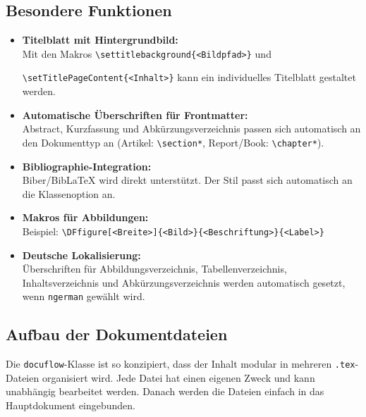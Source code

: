 \subsection{Besondere Funktionen}

\begin{itemize}
    \item \textbf{Titelblatt mit Hintergrundbild:}\\
    Mit den Makros \verb|\settitlebackground{<Bildpfad>}| und 
    
    \verb|\setTitlePageContent{<Inhalt>}| kann ein individuelles Titelblatt gestaltet werden.

    \item \textbf{Automatische Überschriften für Frontmatter:}\\
    Abstract, Kurzfassung und Abkürzungsverzeichnis passen sich automatisch an den Dokumenttyp an (Artikel: \verb|\section*|, Report/Book: \verb|\chapter*|).

    \item \textbf{Bibliographie-Integration:}\\
    Biber/BibLaTeX wird direkt unterstützt. Der Stil passt sich automatisch an die Klassenoption an.

    \item \textbf{Makros für Abbildungen:}\\
    Beispiel: \verb|\DFfigure[<Breite>]{<Bild>}{<Beschriftung>}{<Label>}|
    
    \item \textbf{Deutsche Lokalisierung:}\\
    Überschriften für Abbildungsverzeichnis, Tabellenverzeichnis, Inhaltsverzeichnis und Abkürzungsverzeichnis werden automatisch gesetzt, wenn \texttt{ngerman} gewählt wird.
\end{itemize}


\clearpage

\subsection{Aufbau der Dokumentdateien}

Die \texttt{docuflow}-Klasse ist so konzipiert, dass der Inhalt modular in mehreren \texttt{.tex}-Dateien organisiert wird. Jede Datei hat einen eigenen Zweck und kann unabhängig bearbeitet werden. Danach werden die Dateien einfach in das Hauptdokument eingebunden.

